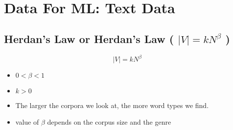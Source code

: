 \chapter{Data For ML: Text Data}

\section{Herdan’s Law or Herdan’s Law ( $|V| = kN^{\beta}$ ) \cite{nlp-1}}

\begin{equation}
    |V| = kN^{\beta}
\end{equation}

\begin{itemize}
    \item $0 < \beta < 1$ 
    \item $k > 0$
    \item The larger the corpora we look at, the more word types we find.
    \item value of $\beta$ depends on the corpus size and the genre
\end{itemize}

















